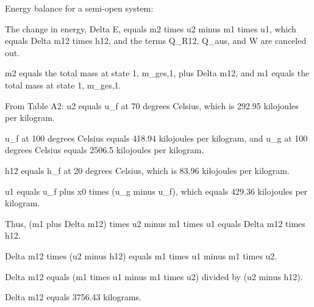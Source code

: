 Energy balance for a semi-open system:

The change in energy, Delta E, equals m2 times u2 minus m1 times u1, which equals Delta m12 times h12, and the terms Q_R12, Q_aus, and W are canceled out.

m2 equals the total mass at state 1, m_ges,1, plus Delta m12, and m1 equals the total mass at state 1, m_ges,1.

From Table A2: u2 equals u_f at 70 degrees Celsius, which is 292.95 kilojoules per kilogram.

u_f at 100 degrees Celsius equals 418.94 kilojoules per kilogram, and u_g at 100 degrees Celsius equals 2506.5 kilojoules per kilogram.

h12 equals h_f at 20 degrees Celsius, which is 83.96 kilojoules per kilogram.

u1 equals u_f plus x0 times (u_g minus u_f), which equals 429.36 kilojoules per kilogram.

Thus, (m1 plus Delta m12) times u2 minus m1 times u1 equals Delta m12 times h12.

Delta m12 times (u2 minus h12) equals m1 times u1 minus m1 times u2.

Delta m12 equals (m1 times u1 minus m1 times u2) divided by (u2 minus h12).

Delta m12 equals 3756.43 kilograms.